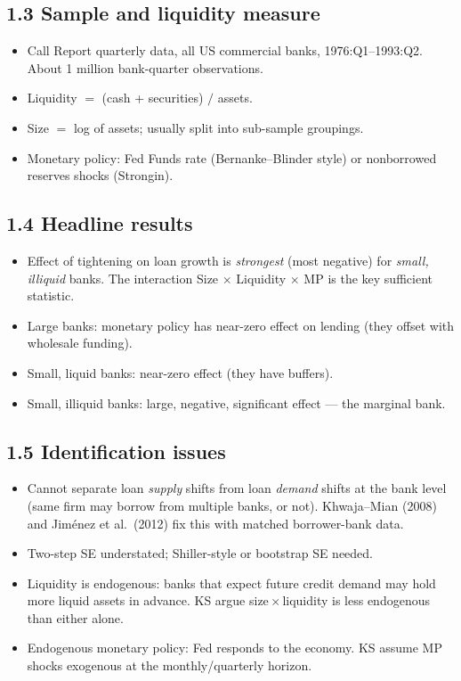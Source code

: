 \documentclass[11pt]{article}
\begin{document}
\subsection*{1.3 Sample and liquidity measure}
\begin{itemize}
\item Call Report quarterly data, all US commercial banks, 1976:Q1--1993:Q2. About 1 million bank-quarter observations.
\item Liquidity $=$ (cash + securities) $/$ assets.
\item Size $=$ log of assets; usually split into sub-sample groupings.
\item Monetary policy: Fed Funds rate (Bernanke--Blinder style) or nonborrowed reserves shocks (Strongin).
\end{itemize}

\subsection*{1.4 Headline results}
\begin{itemize}
\item Effect of tightening on loan growth is \emph{strongest} (most negative) for \emph{small, illiquid} banks. The interaction Size $\times$ Liquidity $\times$ MP is the key sufficient statistic.
\item Large banks: monetary policy has near-zero effect on lending (they offset with wholesale funding).
\item Small, liquid banks: near-zero effect (they have buffers).
\item Small, illiquid banks: large, negative, significant effect --- the marginal bank.
\end{itemize}

\subsection*{1.5 Identification issues}
\begin{alertbox}
\begin{itemize}
\item Cannot separate loan \emph{supply} shifts from loan \emph{demand} shifts at the bank level (same firm may borrow from multiple banks, or not). Khwaja--Mian (2008) and Jim\'enez et al.\ (2012) fix this with matched borrower-bank data.
\item Two-step SE understated; Shiller-style or bootstrap SE needed.
\item Liquidity is endogenous: banks that expect future credit demand may hold more liquid assets in advance. KS argue size\,$\times$\,liquidity is less endogenous than either alone.
\item Endogenous monetary policy: Fed responds to the economy. KS assume MP shocks exogenous at the monthly/quarterly horizon.
\end{itemize}
\end{alertbox}
\end{document}

